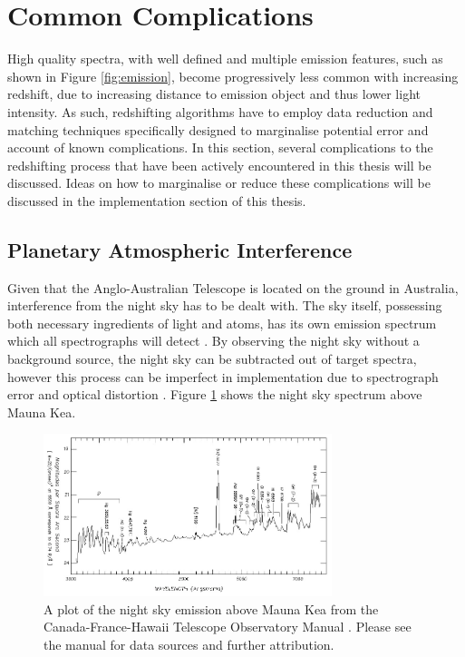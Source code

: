 \documentclass[titlesmallcaps, examinerscopy, copyrightpage]{uqthesis}
\begin{document}
\section{Common Complications}

High quality spectra, with well defined and multiple emission features, such as shown in Figure \ref{fig:emission}, become progressively less common with increasing redshift, due to increasing distance to emission object and thus lower light intensity. As such, redshifting algorithms have to employ data reduction and matching techniques specifically designed to marginalise potential error and account of known complications. In this section, several complications to the redshifting process that have been actively encountered in this thesis will be discussed. Ideas on how to marginalise or reduce these complications will be discussed in the implementation section of this thesis.

\subsection{Planetary Atmospheric Interference}

Given that the Anglo-Australian Telescope is located on the ground in Australia, interference from the night sky has to be dealt with. The sky itself, possessing both necessary ingredients of light and atoms, has its own emission spectrum which all spectrographs will detect \cite{Meinel1950Emission}. By observing the night sky without a background source, the night sky can be subtracted out of target spectra, however this process can be imperfect in implementation due to spectrograph error and optical distortion \cite{Kelson2003Optimal}. Figure \ref{fig:night} shows the night sky spectrum above Mauna Kea.

\begin{figure}[ht!]
\includegraphics[width=0.75\textwidth]{images/om-nskyvis.jpg} 
\centering
\caption{A plot of the night sky emission above Mauna Kea from the Canada-France-Hawaii Telescope Observatory Manual \cite{night}. Please see the manual for data sources and further attribution.}
\label{fig:night}
\end{figure}
\end{document}
